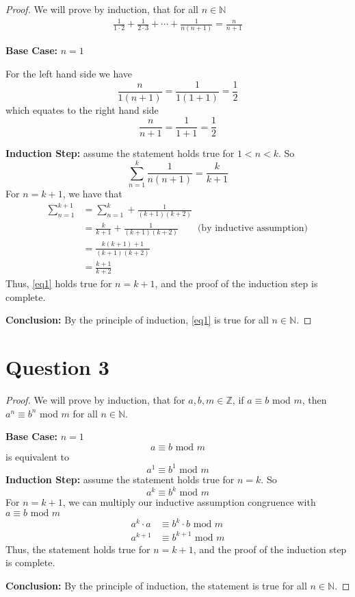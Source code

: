 \documentclass[11pt, oneside]{article}   	%
\begin{document}
\begin{proof} We will prove by induction, that for all $n \in \mathbb{N}$
\begin{align}
\frac{1}{1\cdot2} + \frac{1}{2\cdot3} + \cdots + \frac{1}{n(n+1)} = \frac{n}{n+1}
\label{eq1}
\end{align}

\textbf{Base Case:} $n=1$

For the left hand side we have
$$\frac{n}{1(n+1)} = \frac{1}{1(1+1)} = \frac{1}{2}$$
which equates to the right hand side
$$\frac{n}{n+1} = \frac{1}{1+1} = \frac{1}{2}$$

\textbf{Induction Step:} assume the statement holds true for $1 < n < k$. So
$$\sum_{n=1}^k \frac{1}{n(n+1)} = \frac{k}{k+1}$$
For $n = k+1$, we have that
\begin{align*}
	\sum_{n=1}^{k+1} & = \sum_{n=1}^k + \frac{1}{(k+1)(k+2)} \\
	 & = \frac{k}{k+1} + \frac{1}{(k+1)(k+2)} \qquad \text{(by inductive assumption)} \\
	& = \frac{k(k+1)+1}{(k+1)(k+2)} \\
	& = \frac{k+1}{k+2}
\end{align*}
Thus, \eqref{eq1} holds true for $n=k+1$, and the proof of the induction step is complete.

\textbf{Conclusion:} By the principle of induction, \eqref{eq1} is true for all $n \in \mathbb{N}$.
\end{proof}


\section*{Question 3}

\begin{proof} We will prove by induction, that for $a,b,m \in \mathbb{Z}$, if $a \equiv b$ mod $m$, then $a^n \equiv b^n$ mod $m$ for all $n \in \mathbb{N}$.

\textbf{Base Case:} $n=1$
$$a\equiv b \text{ mod } m$$
is equivalent to
 $$a^1\equiv b^1 \text{ mod } m$$
\textbf{Induction Step:} assume the statement holds true for $n=k$. So
$$a^k \equiv b^k \text{ mod } m$$
For $n = k+1$, we can multiply our inductive assumption congruence with $a \equiv b \text{ mod } m$
\begin{align*}
	a^k \cdot a & \equiv b^k \cdot b \text{ mod } m \\
	a^{k+1} & \equiv b^{k+1} \text{ mod } m 
\end{align*}
Thus, the statement holds true for $n=k+1$, and the proof of the induction step is complete.

\textbf{Conclusion:} By the principle of induction, the statement is true for all $n \in \mathbb{N}$.
\end{proof}
\end{document}
